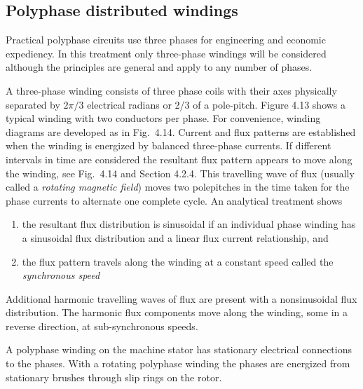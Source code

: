 \documentclass[a4paper,numbers=noenddot,12pt]{scrbook}
\begin{document}
            \subsection{Polyphase distributed windings}
            Practical polyphase circuits use three phases for engineering and economic expediency. In this treatment only three-phase windings will be considered although the principles are general and apply to any number of phases.

            A three-phase winding consists of three phase coils with their axes physically separated by $2\pi/3$ electrical radians or 2/3 of a pole-pitch. Figure 4.13 shows a typical winding with two conductors per phase. For convenience, winding diagrams are developed as in Fig.\ 4.14. Current and flux patterns are established when the winding is energized by balanced three-phase currents. If different intervals in time are considered the resultant flux pattern appears to move along the
            winding, see Fig.\ 4.14 and Section 4.2.4. This travelling wave of flux (usually called a \textit{rotating magnetic field}) moves two pole­pitches in the time taken for the phase currents to alternate one complete cycle. An analytical treatment shows 
            \begin{enumerate}
                \item the resultant flux distribution is sinusoidal if an individual phase winding has a sinusoidal flux distribution and a linear flux current relationship, and
                \item the flux pattern travels along the winding at a constant speed called the \textit{synchronous speed}
            \end{enumerate}

            Additional harmonic travelling waves of flux are present with a non­sinusoidal flux distribution. The harmonic flux components move along the winding, some in a reverse direction, at sub-synchronous speeds. 

            A polyphase winding on the machine stator has stationary electrical connections to the phases. With a rotating polyphase winding the phases are energized from stationary brushes through slip rings on the rotor.
\end{document}
